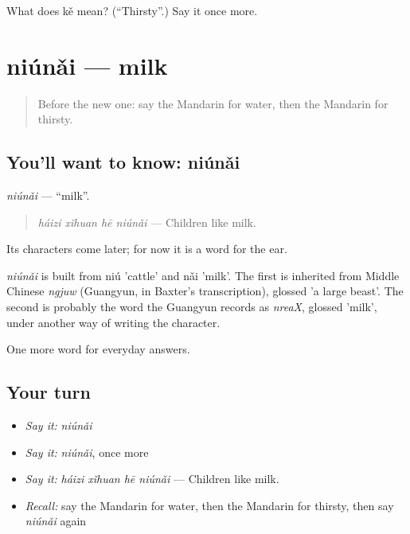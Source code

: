 \begin{tcolorbox}[breakable,colback=teal!4,colframe=teal!35!black,title={Before you move on}]
What does kě mean? (\textquotedblleft{}Thirsty\textquotedblright{}.) Say it once more.
\end{tcolorbox}
\section[niúnǎi]{niúnǎi — milk}

\label{lesson:ZH-C39-niunai}



\begin{quote}
Before the new one: say the Mandarin for water, then the Mandarin for thirsty.
\end{quote}

\subsection*{You'll want to know: niúnǎi}
\emph{niúnǎi} — \textquotedblleft{}milk\textquotedblright{}.

\begin{quote}
\emph{háizi xǐhuan hē niúnǎi} — Children like milk.
\end{quote}

Its characters come later; for now it is a word for the ear.

\begin{cousinweb}
\emph{niúnǎi} is built from niú 'cattle' and nǎi 'milk'. The first is inherited from Middle Chinese \emph{ngjuw} (Guangyun, in Baxter's transcription), glossed 'a large beast'. The second is probably the word the Guangyun records as \emph{nreaX}, glossed 'milk', under another way of writing the character.
\end{cousinweb}

\begin{grammarlens}[title={What you've built}]
One more word for everyday answers.
\end{grammarlens}

\subsection*{Your turn}
\begin{itemize}
\raggedright
  \item \emph{Say it:} \emph{niúnǎi}
  \item \emph{Say it:} \emph{niúnǎi}, once more
  \item \emph{Say it:} \emph{háizi xǐhuan hē niúnǎi} — Children like milk.
  \item \emph{Recall:} say the Mandarin for water, then the Mandarin for thirsty, then say \emph{niúnǎi} again
\end{itemize}

